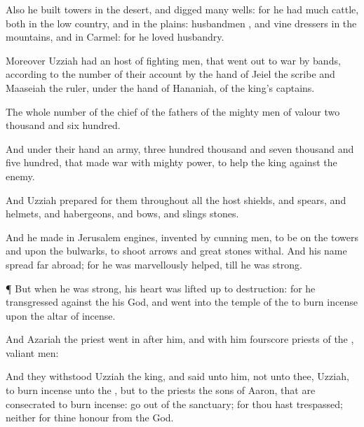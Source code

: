 {Also he
built
towers in the
desert, and
digged
many
wells: for he had
much
cattle, both in the low
country, and in the
plains:
husbandmen
{}, and vine
dressers in the
mountains, and in
Carmel: for he
loved
husbandry.

Moreover
Uzziah had an
host of
fighting
men, that went
out to
war by
bands, according to the
number of their
account by the
hand of
Jeiel the
scribe and
Maaseiah the
ruler, under the
hand of
Hananiah,
{} of the
king’s
captains.

The whole
number of the
chief of the
fathers of the mighty
men of
valour
{} two
thousand and
six
hundred.

And under their
hand
{} an
army,
three
hundred
thousand and
seven
thousand and
five
hundred, that
made
war with
mighty
power, to
help the
king against the
enemy.

And
Uzziah
prepared for them throughout all the
host
shields, and
spears, and
helmets, and
habergeons, and
bows, and
slings
{}
stones.

And he
made in
Jerusalem
engines,
invented by cunning
men, to be on the
towers and upon the
bulwarks, to
shoot
arrows and
great
stones withal. And his
name
spread far
abroad; for he was
marvellously
helped,
till he was
strong.


\par }{\PP {}¶ But when he was
strong, his
heart was lifted
up to
{}
destruction: for he
transgressed against the
{} his
God, and
went into the
temple of the
{} to burn
incense upon the
altar of
incense.

And
Azariah the
priest went
in
after him, and with him
fourscore
priests of the
{},
{}
valiant
men:

And they
withstood
Uzziah the
king, and
said unto him,
{} not unto thee,
Uzziah, to burn
incense unto the
{}, but to the
priests the
sons of
Aaron, that are
consecrated to burn
incense: go
out of the
sanctuary; for thou hast
trespassed; neither
{} for thine
honour from the
{}
God.

}
